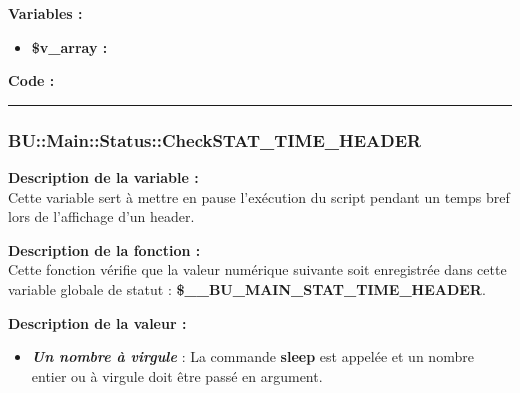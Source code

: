 \documentclass[a4paper,10pt]{article}
\begin{document}
\begin{justify}
    \textbf{Variables :}

    \begin{itemize}
        \item \textbf{\color{orange}\$v\_array\color{white} :}
    \end{itemize}
\end{justify}

\begin{justify}
    \textbf{Code :}
\end{justify}



\color{blue}\par\noindent\rule{\textwidth}{0.4pt}\color{white}

\color{blue}
\subsubsection{\color{mauve}BU::Main::Status::CheckSTAT\_TIME\_HEADER}\color{white}

\begin{justify}
    \textbf{Description de la variable :}\\
    Cette variable sert à mettre en pause l'exécution du script pendant un temps bref lors de l'affichage d'un header.
\end{justify}

\begin{justify}
    \textbf{Description de la fonction :}\\
    Cette fonction vérifie que la valeur numérique suivante soit enregistrée dans cette variable globale de statut : \textbf{\color{orange}\$\_\_BU\_MAIN\_STAT\_TIME\_HEADER}.
\end{justify}

\begin{justify}
    \textbf{Description de la valeur :}

    \begin{itemize}
        \item \textbf{\textit{Un nombre à virgule}} : La commande \textbf{\color{gray}sleep} est appelée et un nombre entier ou à virgule doit être passé en argument.
    \end{itemize}

\end{justify}
\end{document}
